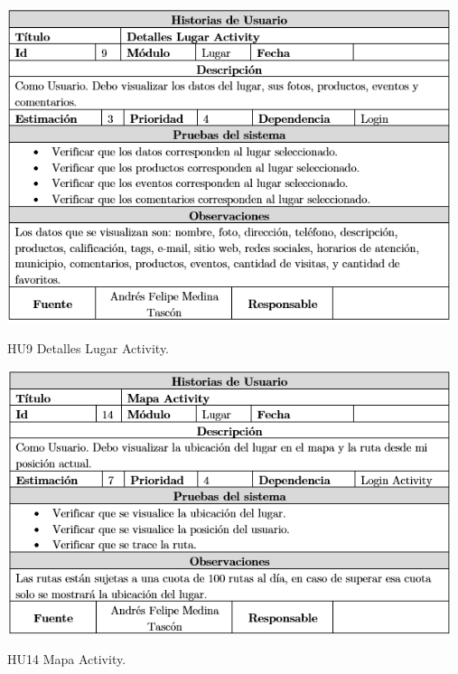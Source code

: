 \documentclass[12pt,letterpaper,openany]{book}
\begin{document}
\begin{table}[H]
\centering
\includegraphics[width=13cm]{./imagenes/HU/HU9}
\caption{HU9 Detalles Lugar Activity.}
\end{table}

\begin{table}[H]
\centering
\includegraphics[width=13cm]{./imagenes/HU/HU14}
\caption{HU14 Mapa Activity.}
\end{table}
\end{document}
